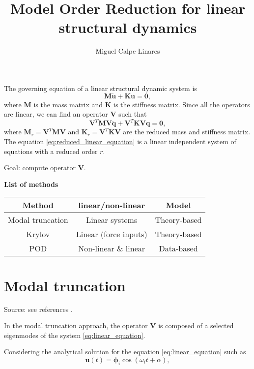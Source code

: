 \documentclass{article}
\title{Model Order Reduction for linear structural dynamics}
\author{Miguel Calpe Linares}
\date{}
\begin{document}
\maketitle

The governing equation of a linear structural dynamic system is
\begin{equation}
    \bm{M}\bm{\ddot{u}} + \bm{K}\bm{u} = \bm{0},
    \label{eq:linear_equation}
\end{equation}
where $\bm{M}$ is the mass matrix and $\bm{K}$ is the stiffness matrix. Since all 
the operators are linear, we can find an operator $\bm{V}$ such that 
\begin{equation}
    \bm{V}^T\bm{M}\bm{V}\bm{\ddot{q}} + \bm{V}^T\bm{K}\bm{V}\bm{q} = \bm{0},
    \label{eq:reduced_linear_equation}
\end{equation}
where $\bm{M}_r=\bm{V}^T\bm{M}\bm{V}$ and $\bm{K}_r=\bm{V}^T\bm{K}\bm{V}$ are the reduced mass and 
stiffness matrix. The equation \ref{eq:reduced_linear_equation} is a linear independent 
system of equations with a reduced order $r$.\newline

Goal: compute operator $\bm{V}$.\newline

\textbf{List of methods}

\begin{center}
  \begin{tabular}{||c c c ||} 
  \hline
  Method & linear/non-linear & Model \\ [0.5ex] 
  \hline\hline
  Modal truncation & Linear systems & Theory-based \\ 
  \hline
  Krylov & Linear (force inputs) & Theory-based \\ 
  \hline
  POD & Non-linear \& linear & Data-based \\ 
  \hline
 \end{tabular}
 \end{center}

\section{Modal truncation}
Source: see references \cite{rutzmoser18}. \newline 

In the modal truncation approach, the operator $\bm{V}$ is composed of a selected  
eigenmodes of the system \ref{eq:linear_equation}.\newline

Considering the analytical solution for the equation \ref{eq:linear_equation} such as
\begin{equation}
    \bm{u}(t) = \bm{\phi}_i \cos (\omega_it + \alpha),
\end{equation}
\end{document}
